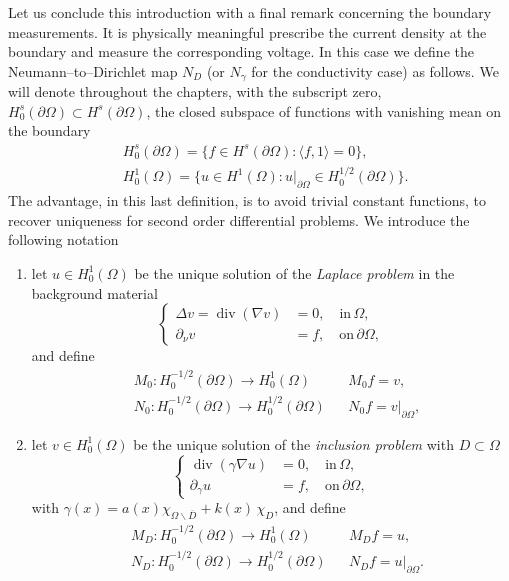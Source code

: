 \documentclass[10pt, a4paper, twoside, openright]{book}
\theoremstyle{definition}
\theoremstyle{plain}
\theoremstyle{plain}
\theoremstyle{plain}
\theoremstyle{plain}
\theoremstyle{plain}
\theoremstyle{plain}
\theoremstyle{plain}
\theoremstyle{plain}
\DeclareMathOperator{\divergence}{div}
\begin{document}
Let us conclude this introduction with a final remark concerning the boundary measurements.
It is physically meaningful prescribe the current density at the boundary and measure the corresponding voltage.
In this case we define the Neumann--to--Dirichlet map $N_D$ (or $N_\gamma$ for the conductivity case) as follows.
We will denote throughout the chapters, with the subscript zero, $H^s_0(\partial\Omega)\subset H^s(\partial\Omega)$, the closed subspace of functions with vanishing mean on the boundary
\begin{align}
&H^s_0(\partial\Omega) = \Big\{ f \in H^s(\partial\Omega): \langle f,1\rangle = 0\Big\},\\
&H^1_0(\Omega) = \Big\{ u \in H^1(\Omega): u|_{\partial\Omega} \in H^{1/2}_0(\partial\Omega)\Big\}.
\end{align}
The advantage, in this last definition, is to avoid trivial constant functions, to recover uniqueness for second order differential problems.
We introduce the following notation
\begin{enumerate}
 \item let $u\in H^1_0(\Omega)$ be the unique solution of the \emph{Laplace problem} in the background material
 \begin{equation}
 \label{eq:NtoD-laplace}
  \left\{
  \begin{aligned}
  \Delta v = \divergence(\nabla v) &= 0, \quad\text{in}\,\Omega, \\
            \partial_\nu v &= f, \quad\text{on}\,\partial \Omega,
  \end{aligned}
  \right.
 \end{equation}
 and define
 \begin{align}
 &M_0: H^{-1/2}_0(\partial \Omega) \to H^1_0(\Omega) && M_0f = v, \label{eq:def-T_0}\\
 &{N_0}: H^{-1/2}_0(\partial \Omega) \to H^{1/2}_0(\partial\Omega) && {N_0} f = v|_{\partial\Omega},
 \end{align}
 \item let $v\in H^1_0(\Omega)$ be the unique solution of the \emph{inclusion problem} with $D\subset \Omega$
 \begin{equation}
 \label{eq:NtoD-inclusion}
  \left\{
  \begin{aligned}
  \divergence(\gamma\nabla u) &= 0, \quad\text{in}\,\Omega, \\
            \partial_\gamma u &= f, \quad\text{on}\,\partial \Omega,
  \end{aligned}
  \right.
 \end{equation}
 with $\gamma(x) = a(x)\chi_{\Omega\backslash\overline{D}} + k(x)\,\chi_D$, and define
 \begin{align}
 &M_D: H^{-1/2}_0(\partial \Omega) \to H^1_0(\Omega) && M_Df = u, \label{eq:def-T_D}\\
 &{N_D}: H^{-1/2}_0(\partial \Omega) \to H^{1/2}_0(\partial\Omega) && {N_D}f = u|_{\partial\Omega}.
 \end{align}
\end{enumerate}
\end{document}
